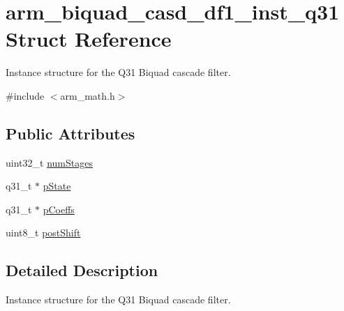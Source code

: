 \hypertarget{structarm__biquad__casd__df1__inst__q31}{\section{arm\-\_\-biquad\-\_\-casd\-\_\-df1\-\_\-inst\-\_\-q31 Struct Reference}
\label{structarm__biquad__casd__df1__inst__q31}
}


Instance structure for the Q31 Biquad cascade filter.  




{\ttfamily \#include $<$arm\-\_\-math.\-h$>$}

\subsection*{Public Attributes}
\begin{DoxyCompactItemize}
\item 
uint32\-\_\-t \hyperlink{structarm__biquad__casd__df1__inst__q31_a2c2b579f1df1d8273a5d9d945c27e1b2}{num\-Stages}
\item 
q31\-\_\-t $\ast$ \hyperlink{structarm__biquad__casd__df1__inst__q31_a5dcf4727f58eb4e8e8b392508d8657bb}{p\-State}
\item 
q31\-\_\-t $\ast$ \hyperlink{structarm__biquad__casd__df1__inst__q31_aa62366c632f3b5305086f841f079dbd2}{p\-Coeffs}
\item 
uint8\-\_\-t \hyperlink{structarm__biquad__casd__df1__inst__q31_a636c7fbe09ec4bef0bc0a4b4e2151cbe}{post\-Shift}
\end{DoxyCompactItemize}


\subsection{Detailed Description}
Instance structure for the Q31 Biquad cascade filter. 

